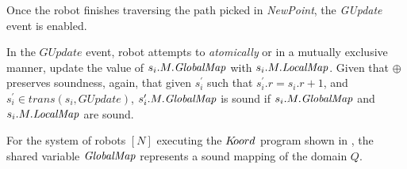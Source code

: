 Once the robot finishes traversing the path picked in \emph{NewPoint}, the \emph{GUpdate} event is enabled.


 In the $GUpdate$ event, robot attempts to \emph{atomically} or in a mutually exclusive manner, update the value of $s_i.M.\mathit{GlobalMap}$ with  $s_i.M.\mathit{LocalMap}$. Given that $\oplus$ preserves soundness, again, that given $s_i^\prime$ such that $s_i^\prime.r = s_i.r + 1$, and $\mathit{s_i^\prime \in \mathit{trans}(s_i,\mathit{GUpdate})}$,  $s_i^\prime.M.\mathit{GlobalMap}$ is sound if $s_i.M.\mathit{GlobalMap}$ and $s_i.M.\mathit{LocalMap}$ are sound.

\begin{theorem}
    For the system of robots $[N]$ executing the $K\kern-2pt oord$ program shown in , the shared variable $\mathit{GlobalMap}$ represents a sound mapping of the domain $Q$.
\end{theorem}

